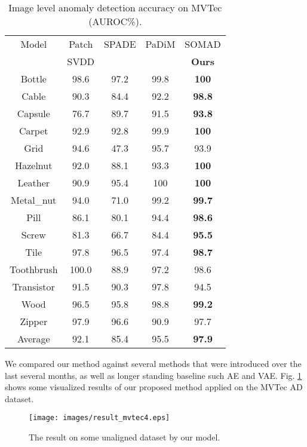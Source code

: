 \documentclass{article}
\begin{document}
\begin{table}[htb]
\footnotesize
	\centering
	\caption{Image level anomaly detection accuracy on MVTec (AUROC\%).}
	\label{img_auc}
	\begin{tabular}{c|ccc|c}
	    \hline
		Model   & Patch\cite{PatchSVDD} & SPADE & PaDiM & SOMAD \\
		 &  SVDD  & \cite{SPADE} & \cite{Padim} & \textbf{Ours} \\
		\hline
		Bottle      & 98.6  & 97.2 & 99.8 & \textbf{100}  \\
		Cable       & 90.3  & 84.4 & 92.2 & \textbf{98.8} \\
		Capsule     & 76.7  & 89.7 & 91.5 & \textbf{93.8} \\
		Carpet      & 92.9  & 92.8 & 99.9 & \textbf{100}  \\
		Grid        & 94.6  & 47.3 & 95.7 & 93.9 \\
		Hazelnut    & 92.0  & 88.1 & 93.3 & \textbf{100}  \\
		Leather     & 90.9  & 95.4 & 100 &  \textbf{100}  \\
		Metal\_nut  & 94.0  & 71.0 & 99.2 & \textbf{99.7} \\
		Pill        & 86.1  & 80.1 & 94.4 & \textbf{98.6} \\
		Screw       & 81.3  & 66.7 & 84.4 & \textbf{95.5} \\
		Tile        & 97.8  & 96.5 & 97.4 & \textbf{98.7} \\
		Toothbrush  & 100.0 & 88.9 & 97.2 & 98.6 \\
		Transistor  & 91.5  & 90.3 & 97.8 & 94.5 \\
		Wood        & 96.5  & 95.8 & 98.8 & \textbf{99.2} \\
		Zipper      & 97.9  & 96.6 & 90.9 & 97.7 \\
		\hline
		Average     & 92.1  & 85.4 & 95.5 & \textbf{97.9} \\
		\hline
	\end{tabular}
\end{table}

We compared our method against several methods that were introduced over the last several months, as well as longer standing baseline such AE and VAE. Fig. \ref{fig:result_show} shows some visualized results of our proposed method applied on the MVTec AD dataset.
\begin{figure}[htbp]
	\centering
	\texttt{[image: images/result\_mvtec4.eps]}
	\caption{The result on some unaligned dataset by our model.}
	\label{fig:result_show}
\end{figure}
\end{document}
